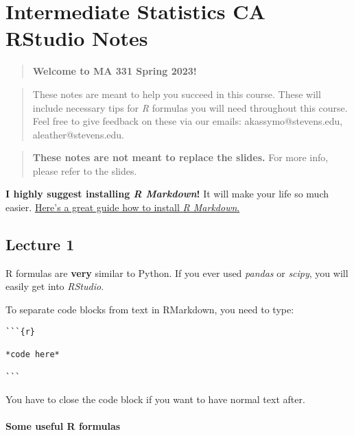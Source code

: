 \hypertarget{intermediate-statistics-ca-rstudio-notes}{%
\section{Intermediate Statistics CA RStudio
Notes}\label{intermediate-statistics-ca-rstudio-notes}}

\begin{quote}
\textbf{Welcome to MA 331 Spring 2023!}
\end{quote}

\begin{quote}
These notes are meant to help you succeed in this course. These will
include necessary tips for \emph{R} formulas you will need throughout
this course. Feel free to give feedback on these via our emails:
akassymo@stevens.edu, aleather@stevens.edu.
\end{quote}

\begin{quote}
\textbf{These notes are not meant to replace the slides.} For more info,
please refer to the slides.
\end{quote}

\textbf{I highly suggest installing \emph{R Markdown}!} It will make
your life so much easier.
\href{https://alexd106.github.io/intro2R/install_rmarkdown.html}{Here's
a great guide how to install \emph{R Markdown}.}

\hypertarget{lecture-1}{%
\subsection{Lecture 1}\label{lecture-1}}

R formulas are \textbf{very} similar to Python. If you ever used
\emph{pandas} or \emph{scipy}, you will easily get into \emph{RStudio}.

To separate code blocks from text in RMarkdown, you need to type:

\begin{verbatim}
```{r}

*code here*

```
\end{verbatim}

You have to close the code block if you want to have normal text after.

\hypertarget{some-useful-r-formulas}{%
\paragraph{Some useful R formulas}\label{some-useful-r-formulas}}

